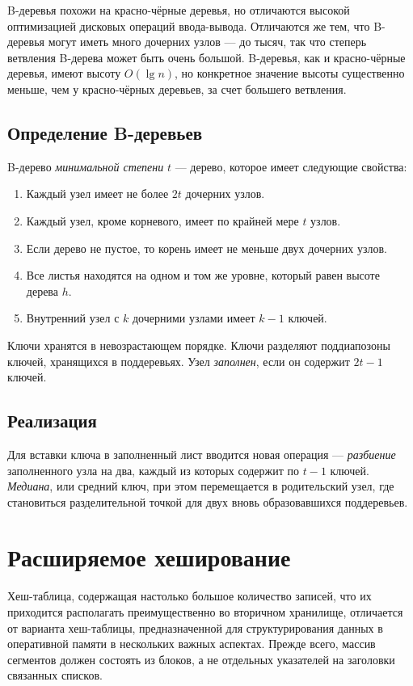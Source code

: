 B-деревья похожи на красно-чёрные деревья, но отличаются высокой оптимизацией дисковых операций ввода-вывода. Отличаются же тем, что B-деревья могут иметь много дочерних узлов — до тысяч, так что степерь ветвления B-дерева может быть очень большой. B-деревья, как и красно-чёрные деревья, имеют высоту $O(\lg n)$, но конкретное значение высоты существенно меньше, чем у красно-чёрных деревьев, за счет большего ветвления.

\subsection{Определение B-деревьев}
B-дерево \emph{минимальной степени} $t$ — дерево, которое имеет следующие свойства:
\begin{enumerate}
  \item Каждый узел имеет не более $2t$ дочерних узлов.
  \item Каждый узел, кроме корневого, имеет по крайней мере $t$ узлов.
  \item Если дерево не пустое, то корень имеет не меньше двух дочерних узлов.
  \item Все листья находятся на одном и том же уровне, который равен высоте дерева $h$.
  \item Внутренний узел с $k$ дочерними узлами имеет $k - 1$ ключей.
\end{enumerate}

Ключи хранятся в невозрастающем порядке. Ключи разделяют поддиапозоны ключей, хранящихся в поддеревьях. Узел \emph{заполнен}, если он содержит $2t - 1$ ключей.

\subsection{Реализация}
Для вставки ключа в заполненный лист вводится новая операция — \emph{разбиение} заполненного узла на два, каждый из которых содержит по $t - 1$ ключей. \emph{Медиана}, или средний ключ,  при этом перемещается в родительский узел, где становиться разделительной точкой для двух вновь образовавшихся поддеревьев.



\section {Расширяемое хеширование}
\label{sec:ext-hashing}
Хеш-таблица, содержащая настолько большое количество записей, что их приходится располагать преимущественно во вторичном хранилище, отличается от варианта хеш-таблицы, предназначенной для структурирования данных в оперативной памяти в нескольких важных аспектах. Прежде всего, массив сегментов должен состоять из блоков, а не отдельных указателей на заголовки связанных списков.

